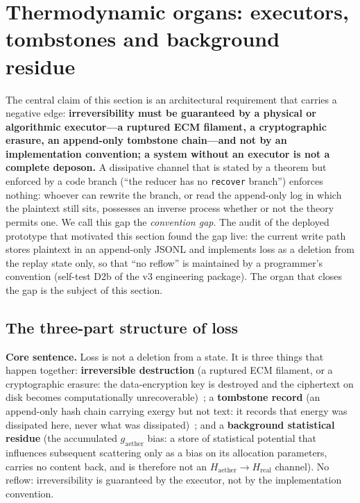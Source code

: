 \documentclass[11pt,a4paper]{article}
\newcommand{\gaether}{g_{\mathrm{aether}}}
\begin{document}
\section{Thermodynamic organs: executors, tombstones and background residue}
\label{sec:organs}

The central claim of this section is an architectural requirement that carries a negative edge: \textbf{irreversibility must be guaranteed by a physical or algorithmic executor---a ruptured ECM filament, a cryptographic erasure, an append-only tombstone chain---and not by an implementation convention; a system without an executor is not a complete deposon.} A dissipative channel that is stated by a theorem but enforced by a code branch (``the reducer has no \texttt{recover} branch'') enforces nothing: whoever can rewrite the branch, or read the append-only log in which the plaintext still sits, possesses an inverse process whether or not the theory permits one. We call this gap the \emph{convention gap}. The audit of the deployed prototype that motivated this section found the gap live: the current write path stores plaintext in an append-only JSONL and implements loss as a deletion from the replay state only, so that ``no reflow'' is maintained by a programmer's convention (self-test D2b of the v3 engineering package). The organ that closes the gap is the subject of this section.

\subsection{The three-part structure of loss}
\label{sec:organs-three}

\textbf{Core sentence.} Loss is not a deletion from a state. It is three things that happen together: \textbf{irreversible destruction} (a ruptured ECM filament, or a cryptographic erasure: the data-encryption key is destroyed and the ciphertext on disk becomes computationally unrecoverable)~\cite{kissel2014,reardon2013,geambasu2009}; a \textbf{tombstone record} (an append-only hash chain carrying exergy but not text: it records that energy was dissipated here, never what was dissipated)~\cite{haber1991,schneier1999,oneil1996}; and a \textbf{background statistical residue} (the accumulated $\gaether$ bias: a store of statistical potential that influences subsequent scattering only as a bias on its allocation parameters, carries no content back, and is therefore not an $H_{\mathrm{aether}}\to H_{\mathrm{real}}$ channel). No reflow: irreversibility is guaranteed by the executor, not by the implementation convention.
\end{document}
